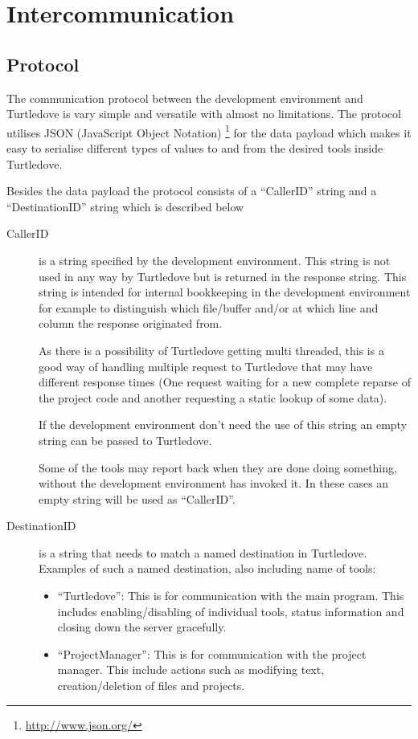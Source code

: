 \documentclass[a4paper, oneside, final]{memoir}
\begin{document}
\chapter*{Intercommunication}


\section*{Protocol}


The communication protocol between the development environment and Turtledove is
vary simple and versatile with almost no limitations. The protocol utilises JSON
(JavaScript Object Notation) \footnote{\url{http://www.json.org/}} for the data
payload which makes it easy to serialise different types of values to and from
the desired tools inside Turtledove.

Besides the data payload the protocol consists of a ``CallerID'' string and a
``DestinationID'' string which is described below

\begin{description}
\item[CallerID] is a string specified by the development environment. This
  string is not used in any way by Turtledove but is returned in the response
  string. This string is intended for internal bookkeeping in the development
  environment for example to distinguish which file/buffer and/or at which line
  and column the response originated from.

  As there is a possibility of Turtledove getting multi threaded, this is a good
  way of handling multiple request to Turtledove that may have different
  response times (One request waiting for a new complete reparse of the project code
  and another requesting a static lookup of some data).

  If the development environment don't need the use of this string an empty
  string can be passed to Turtledove.

  Some of the tools may report back when they are done doing something, without
  the development environment has invoked it. In these cases an empty string
  will be used as ``CallerID''.

\item[DestinationID] is a string that needs to match a named destination in
  Turtledove. Examples of such a named destination, also including name of
  tools:

  \begin{itemize}
  \item ``Turtledove'': This is for communication with the main program. This
    includes enabling/disabling of individual tools, status information and
    closing down the server gracefully.

  \item ``ProjectManager'': This is for communication with the project
    manager. This include actions such as modifying text, creation/deletion of
    files and projects.
  \end{itemize}
\end{description}
\end{document}
